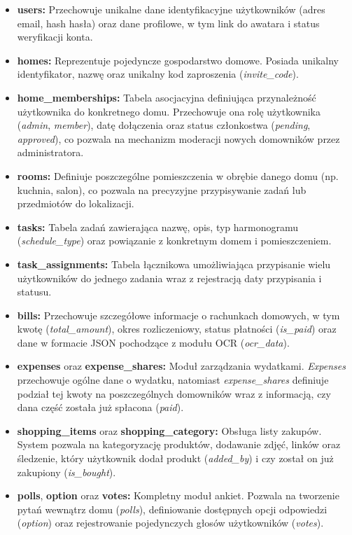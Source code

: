 \begin{itemize}
    \item \textbf{users:} Przechowuje unikalne dane identyfikacyjne użytkowników (adres email, hash hasła) oraz dane profilowe, w tym link do awatara i status weryfikacji konta.
    \item \textbf{homes:} Reprezentuje pojedyncze gospodarstwo domowe. Posiada unikalny identyfikator, nazwę oraz unikalny kod zaproszenia (\textit{invite\_code}).
    \item \textbf{home\_memberships:} Tabela asocjacyjna definiująca przynależność użytkownika do konkretnego domu. Przechowuje ona rolę użytkownika (\textit{admin}, \textit{member}), datę dołączenia oraz status członkostwa (\textit{pending}, \textit{approved}), co pozwala na mechanizm moderacji nowych domowników przez administratora.
    \item \textbf{rooms:} Definiuje poszczególne pomieszczenia w obrębie danego domu (np. kuchnia, salon), co pozwala na precyzyjne przypisywanie zadań lub przedmiotów do lokalizacji.
    \item \textbf{tasks:} Tabela zadań zawierająca nazwę, opis, typ harmonogramu (\textit{schedule\_type}) oraz powiązanie z konkretnym domem i pomieszczeniem.
    \item \textbf{task\_assignments:} Tabela łącznikowa umożliwiająca przypisanie wielu użytkowników do jednego zadania wraz z rejestracją daty przypisania i statusu.
    \item \textbf{bills:} Przechowuje szczegółowe informacje o rachunkach domowych, w tym kwotę (\textit{total\_amount}), okres rozliczeniowy, status płatności (\textit{is\_paid}) oraz dane w formacie JSON pochodzące z modułu OCR (\textit{ocr\_data}).
    \item \textbf{expenses} oraz \textbf{expense\_shares:} Moduł zarządzania wydatkami. \textit{Expenses} przechowuje ogólne dane o wydatku, natomiast \textit{expense\_shares} definiuje podział tej kwoty na poszczególnych domowników wraz z informacją, czy dana część została już spłacona (\textit{paid}).
    \item \textbf{shopping\_items} oraz \textbf{shopping\_category:} Obsługa listy zakupów. System pozwala na kategoryzację produktów, dodawanie zdjęć, linków oraz śledzenie, który użytkownik dodał produkt (\textit{added\_by}) i czy został on już zakupiony (\textit{is\_bought}).
    \item \textbf{polls}, \textbf{option} oraz \textbf{votes:} Kompletny moduł ankiet. Pozwala na tworzenie pytań wewnątrz domu (\textit{polls}), definiowanie dostępnych opcji odpowiedzi (\textit{option}) oraz rejestrowanie pojedynczych głosów użytkowników (\textit{votes}).
\end{itemize}

